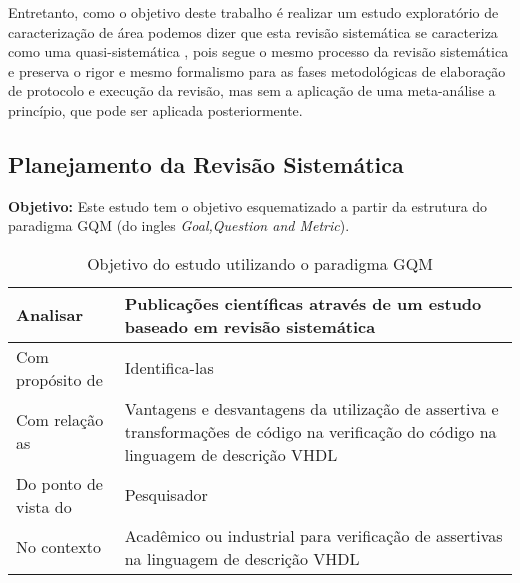 Entretanto, como o objetivo deste trabalho é realizar um estudo exploratório de caracterização de área podemos dizer que esta revisão sistemática se caracteriza como uma quasi-sistemática \cite{travassos2008environment}, pois segue o mesmo processo da revisão sistemática e preserva o rigor e mesmo formalismo para as fases metodológicas de elaboração de protocolo e execução da revisão, mas sem a aplicação de uma meta-análise a princípio, que pode ser aplicada posteriormente.

\subsection{Planejamento da Revisão Sistemática}
\textbf{Objetivo:} Este estudo tem o objetivo esquematizado a partir da estrutura do paradigma GQM (do ingles \textit{Goal,Question and Metric})\cite{basili1994experience}.

\begin{table}[h!]
\centering
\label{}
\begin{tabularx}{\textwidth}{|l|X|}
\hline
Analisar & Publicações científicas através de um estudo baseado em revisão sistemática \\ \hline
Com propósito de & Identifica-las \\ \hline
Com relação as & Vantagens e desvantagens da utilização de assertiva e transformações de código na verificação do código na linguagem de descrição VHDL \\ \hline
Do ponto de vista do & Pesquisador \\ \hline
No contexto & Acadêmico ou industrial para verificação de assertivas na linguagem de descrição VHDL \\ \hline
\end{tabularx}
\caption{Objetivo do estudo utilizando o paradigma GQM}
\end{table}

